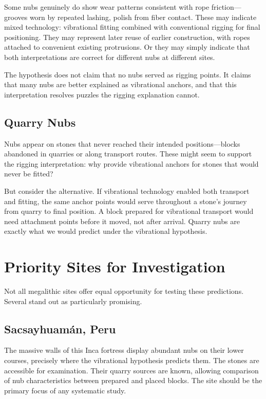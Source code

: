 \documentclass[11pt]{article}
\begin{document}
Some nubs genuinely do show wear patterns consistent with rope friction—grooves worn by repeated lashing, polish from fiber contact. These may indicate mixed technology: vibrational fitting combined with conventional rigging for final positioning. They may represent later reuse of earlier construction, with ropes attached to convenient existing protrusions. Or they may simply indicate that both interpretations are correct for different nubs at different sites.

The hypothesis does not claim that no nubs served as rigging points. It claims that many nubs are better explained as vibrational anchors, and that this interpretation resolves puzzles the rigging explanation cannot.

\subsection{Quarry Nubs}

Nubs appear on stones that never reached their intended positions—blocks abandoned in quarries or along transport routes. These might seem to support the rigging interpretation: why provide vibrational anchors for stones that would never be fitted?

But consider the alternative. If vibrational technology enabled both transport and fitting, the same anchor points would serve throughout a stone's journey from quarry to final position. A block prepared for vibrational transport would need attachment points before it moved, not after arrival. Quarry nubs are exactly what we would predict under the vibrational hypothesis.

\section{Priority Sites for Investigation}

Not all megalithic sites offer equal opportunity for testing these predictions. Several stand out as particularly promising.

\subsection{Sacsayhuamán, Peru}

The massive walls of this Inca fortress display abundant nubs on their lower courses, precisely where the vibrational hypothesis predicts them. The stones are accessible for examination. Their quarry sources are known, allowing comparison of nub characteristics between prepared and placed blocks. The site should be the primary focus of any systematic study.
\end{document}
